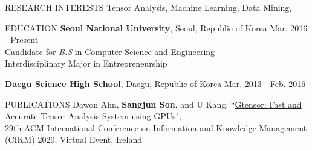 \documentclass[10pt]{resume} %
\begin{document}


\begin{rSection}{RESEARCH INTERESTS}
Tensor Analysis, Machine Learning, Data Mining, 
\end{rSection}
%
\begin{rSection}{EDUCATION}
{\bf Seoul National University}, Seoul, Republic of Korea \hfill Mar. 2016 - Present \\
Candidate for \textit{B.S} in Computer Science and Engineering \\
Interdisciplinary Major in Entrepreneurship

{\bf Daegu Science High School}, Daegu, Republic of Korea \hfill Mar. 2013 - Feb. 2016
\end{rSection}

\begin{rSection}{PUBLICATIONS}
Dawon Ahn, \textbf{Sangjun Son}, and U Kang, 
	``\href{https://dl.acm.org/doi/abs/10.1145/3340531.3417413}
	{Gtensor: Fast and Accurate Tensor Analysis System using GPUs}", \\
	29th ACM International Conference on 
	Information and Knowledge Management (CIKM) 2020, Virtual Event, Ireland
\end{rSection}
\end{document}
